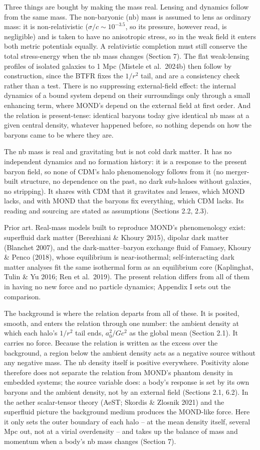 \documentclass[
  10pt,
]{article}
\begin{document}
Three things are bought by making the mass real. Lensing and dynamics follow from the same mass. The non-baryonic (nb) mass is assumed to lens as ordinary mass: it is non-relativistic ($\sigma/c\sim10^{-3.5}$, so its pressure, however read, is negligible) and is taken to have no anisotropic stress, so in the weak field it enters both metric potentials equally. A relativistic completion must still conserve the total stress-energy when the nb mass changes (Section 7). The flat weak-lensing profiles of isolated galaxies to 1 Mpc (Mistele et al.~2024b) then follow by construction, since the BTFR fixes the $1/r^2$ tail, and are a consistency check rather than a test. There is no suppressing external-field
effect: the internal dynamics of a bound system depend on their
surroundings only through a small enhancing term, where MOND's depend on
the external field at first order. And the relation is present-tense:
identical baryons today give identical nb mass at a given central density, whatever happened
before, so nothing depends on how the baryons came to be where they are.

The nb mass is real and gravitating but is not cold dark matter. It has no independent dynamics and no formation history: it is a response to the present baryon field, so none of CDM's halo phenomenology follows from it (no merger-built structure, no dependence on the past, no dark sub-haloes without galaxies, no stripping). It shares with CDM that it gravitates and lenses, which MOND lacks, and with MOND that the baryons fix everything, which CDM lacks. Its reading and sourcing are stated as assumptions (Sections 2.2, 2.3).

Prior art. Real-mass models built to reproduce MOND's phenomenology exist: superfluid dark matter (Berezhiani \& Khoury 2015), dipolar dark matter (Blanchet 2007), and the dark-matter--baryon exchange fluid of Famaey, Khoury \& Penco (2018), whose equilibrium is near-isothermal; self-interacting dark matter analyses fit the same isothermal form as an equilibrium core (Kaplinghat, Tulin \& Yu 2016; Ren et al.~2019). The present relation differs from all of them in having no new force and no particle dynamics; Appendix I sets out the comparison.

The background is where the relation departs from all of these. It is posited, smooth, and enters the relation through one number: the ambient density at which each halo's $1/r^2$ tail ends, $a_0^2/Gc^2$ as the global mean (Section 2.1). It carries no force. Because the relation is written as the excess over the background, a region below the ambient density acts as a negative source without any negative mass. The nb density itself is positive everywhere. Positivity alone therefore does not separate the relation from MOND's phantom density in embedded systems; the source variable does: a body's response is set by its own baryons and the ambient density, not by an external field (Sections 2.1, 6.2). In the aether scalar-tensor theory (AeST; Skordis \& Zlosnik 2021) and the superfluid picture the background medium produces the MOND-like force. Here it only sets the outer boundary of each halo -- at the mean density itself, several Mpc out, not at a virial overdensity -- and takes up the balance of mass and momentum when a body's nb mass changes (Section 7).
\end{document}
